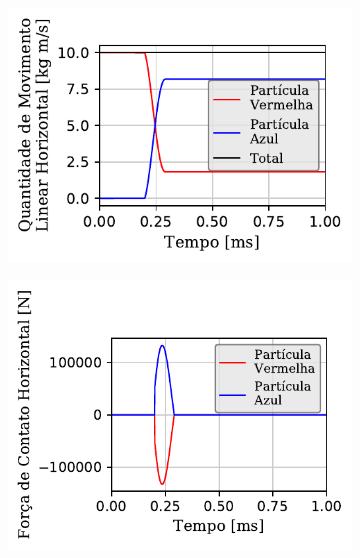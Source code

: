 \begin{figure}[H]
{\begin{subfigure}[t]{\smallresultsfigwidth}
			\caption{}
			\label{subfig:colliding_spheres:dissipative:x_velocity}
		\end{subfigure}
		\begin{subfigure}[t]{\smallresultsfigwidth}
			\centering
			\includegraphics[scale=0.95]{images/colliding_spheres/dissipative/linearMomentum-X_small_total_alternative.pdf}
			\caption{}
			\label{subfig:colliding_spheres:dissipative:x_linear_momentum}
		\end{subfigure}
		\begin{subfigure}[t]{\smallresultsfigwidth}
			\centering
			\includegraphics[scale=0.95]{images/colliding_spheres/dissipative/contactForce-X_small.pdf}
			\caption{}
			\label{subfig:colliding_spheres:dissipative:x_contact_force}

\end{subfigure}}
\end{figure}
